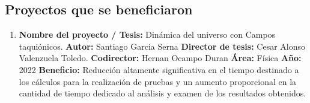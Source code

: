 \begin{spacing}{1.5}
    \begin{tightcenter}
    \section{Proyectos que se beneficiaron}
    \end{tightcenter}
    
    \begin{enumerate}
        \item \textbf{Nombre del proyecto / Tesis:} Dinámica del universo con Campos taquiónicos. \newline
        \textbf{Autor:} Santiago Garcia Serna \newline
        \textbf{Director de tesis:} Cesar Alonso Valenzuela Toledo. \newline
        \textbf{Codirector:} Hernan Ocampo Duran \newline
        \textbf{Área:} Física \newline
        \textbf{Año:} 2022 \newline
        \textbf{Beneficio:} Reducción altamente significativa en el tiempo destinado a los cálculos para la realización de pruebas y un aumento proporcional en la cantidad de tiempo dedicado al análisis y examen de los resultados obtenidos.
    \end{enumerate}

    
    \mylinespacing
    \mylinespacing
    \begin{tightcenter}
    \end{tightcenter}
    \end{spacing}
    